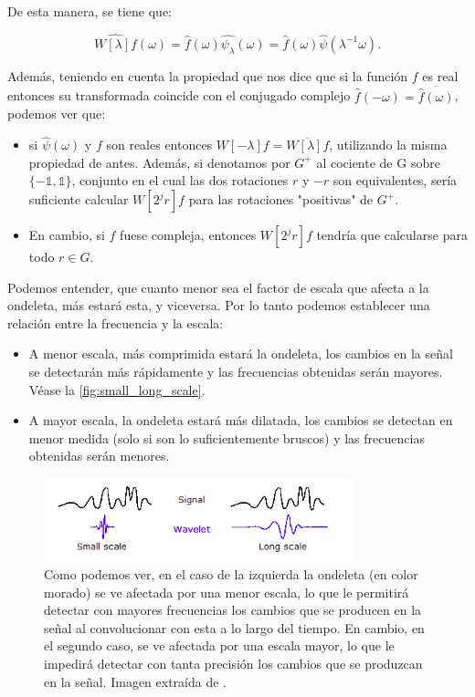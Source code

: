 De esta manera, se tiene que: 

$$\widehat{W[\lambda]f}(\omega)=\widehat{f}(\omega)\widehat{\psi_\lambda}(\omega)=\widehat{f}(\omega)\widehat{\psi}(\lambda^{-1}\omega).$$

\noindent Además, teniendo en cuenta la propiedad que nos dice que si la función $f$ es real entonces su transformada coincide con el conjugado complejo $\widehat{f}(-\omega)=\overline{\widehat{f}(\omega)}$, podemos ver que: 

\begin{itemize}
  \item si $\widehat{\psi}(\omega)$ y $f$ son reales entonces $W[-\lambda]f= \overline{W[\lambda]f}$, utilizando la misma propiedad de antes. Además, si denotamos por $G^{+}$ al cociente de G sobre $\lbrace-\mathbb{1},\mathbb{1}\rbrace$, conjunto en el cual las dos rotaciones $r$ y $-r$ son equivalentes, sería suficiente calcular $W[2^jr]f$ para las rotaciones "positivas" de $G^{+}$.
  \item En cambio, si $f$ fuese compleja, entonces $W[2^jr]f$ tendría que calcularse para todo $r \in G$.
\end{itemize}

\medskip
 
\noindent Podemos entender, que cuanto menor sea el factor de escala que afecta a la ondeleta, más  estará esta, y viceversa. Por lo tanto podemos establecer una relación entre la frecuencia y la escala: 

\begin{itemize}
  \item A menor escala, más comprimida estará la ondeleta, los cambios en la señal se detectarán más rápidamente y las frecuencias obtenidas serán mayores. Véase la \autoref{fig:small_long_scale}.
  \item A mayor escala, la ondeleta estará más dilatada, los cambios se detectan en menor medida (solo si son lo suficientemente bruscos) y las frecuencias obtenidas serán menores.
\end{itemize}

\begin{figure} [!h]
  \centering
  \includegraphics[width=0.8\textwidth]{img/Relacion_escala_frecuencia.png}
  \caption{Como podemos ver, en el caso de la izquierda la ondeleta (en color morado) se ve afectada por una menor escala, lo que le permitirá detectar con mayores frecuencias los cambios que se producen en la señal al convolucionar con esta a lo largo del tiempo. En cambio, en el segundo caso, se ve afectada por una escala mayor, lo que le impedirá detectar con tanta precisión los cambios que se produzcan en la señal. Imagen extraída de \cite{WAVELETS}.}
  \label{fig:small_long_scale}
\end{figure}

